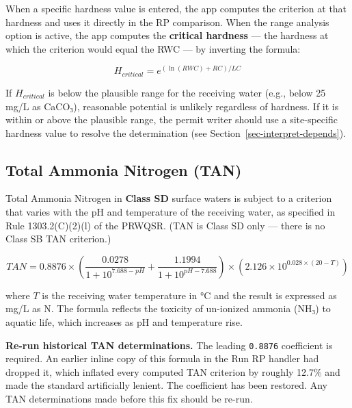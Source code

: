 \documentclass[
  11pt,
  letterpaper,
  DIV=11,
  numbers=noendperiod]{scrartcl}
\begin{document}
When a specific hardness value is entered, the app computes the
criterion at that hardness and uses it directly in the RP comparison.
When the range analysis option is active, the app computes the
\textbf{critical hardness} --- the hardness at which the criterion would
equal the RWC --- by inverting the formula:

\[H_{critical} = e^{\left(\ln(RWC) + RC\right) / LC}\]

If \(H_{critical}\) is below the plausible range for the receiving water
(e.g., below 25 mg/L as CaCO₃), reasonable potential is unlikely
regardless of hardness. If it is within or above the plausible range,
the permit writer should use a site-specific hardness value to resolve
the determination (see Section~\ref{sec-interpret-depends}).

\subsection{Total Ammonia Nitrogen (TAN)}\label{sec-tan}

Total Ammonia Nitrogen in \textbf{Class SD} surface waters is subject to
a criterion that varies with the pH and temperature of the receiving
water, as specified in Rule 1303.2(C)(2)(l) of the PRWQSR. (TAN is Class
SD only --- there is no Class SB TAN criterion.)

\[TAN = 0.8876 \times \left(\frac{0.0278}{1 + 10^{7.688 - pH}} + \frac{1.1994}{1 + 10^{pH - 7.688}}\right) \times \left(2.126 \times 10^{0.028 \times (20 - T)}\right)\]

where \(T\) is the receiving water temperature in °C and the result is
expressed as mg/L as N. The formula reflects the toxicity of un-ionized
ammonia (NH₃) to aquatic life, which increases as pH and temperature
rise.

\begin{tcolorbox}[enhanced jigsaw, arc=.35mm, bottomrule=.15mm, bottomtitle=1mm, breakable, colback=white, colbacktitle=quarto-callout-warning-color!10!white, colframe=quarto-callout-warning-color-frame, coltitle=black, left=2mm, leftrule=.75mm, opacityback=0, opacitybacktitle=0.6, rightrule=.15mm, title=\textcolor{quarto-callout-warning-color}{\faExclamationTriangle}\hspace{0.5em}{Warning}, titlerule=0mm, toprule=.15mm, toptitle=1mm]

\textbf{Re-run historical TAN determinations.} The leading
\texttt{0.8876} coefficient is required. An earlier inline copy of this
formula in the Run RP handler had dropped it, which inflated every
computed TAN criterion by roughly 12.7\% and made the standard
artificially lenient. The coefficient has been restored. Any TAN
determinations made before this fix should be re-run.

\end{tcolorbox}
\end{document}

